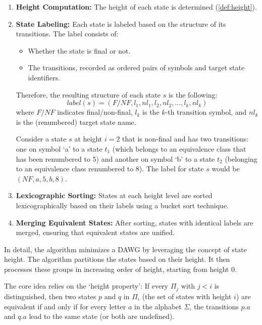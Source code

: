 \begin{enumerate}
    \item \textbf{Height Computation:} The height of each state is determined (\cref{def:height}).
    \item \textbf{State Labeling:} Each state is labeled based on the structure of its transitions. The label consists of:
    \begin{itemize}
        \item Whether the state is final or not.
        \item The transitions, recorded as ordered pairs of symbols and target state identifiers.
    \end{itemize}
    Therefore, the resulting structure of each state $s$ is the following:
    $$label(s) = (F/NF, l_1, nl_1, l_2, nl_2, \dots, l_k, nl_k)$$
    where $F/NF$ indicates final/non-final, $l_k$ is the $k$-th transition symbol, and $nl_k$ is the (renumbered) target state name.

    \begin{example}
        Consider a state $s$ at height $i=2$ that is non-final and has two transitions: one on symbol `a' to a state $t_1$ (which belongs to an equivalence class that has been renumbered to 5) and another on symbol `b' to a state $t_2$ (belonging to an equivalence class renumbered to 8). The label for state $s$ would be $(NF, a, 5, b, 8)$.
    \end{example}
    \item \textbf{Lexicographic Sorting:} States at each height level are sorted lexicographically based on their labels using a bucket sort technique.
    \item \textbf{Merging Equivalent States:} After sorting, states with identical labels are merged, ensuring that equivalent states are unified.
\end{enumerate}

In detail, the algorithm minimizes a DAWG by leveraging the concept of state height. The algorithm partitions the states based on their height. It then processes these groups in increasing order of height, starting from height 0.

The core idea relies on the `height property': If every $\Pi_j$ with $j < i$ is distinguished, then two states $p$ and $q$ in $\Pi_i$ (the set of states with height $i$) are equivalent if and only if for every letter $a$ in the alphabet $\Sigma$, the transitions $p.a$ and $q.a$ lead to the same state (or both are undefined).


